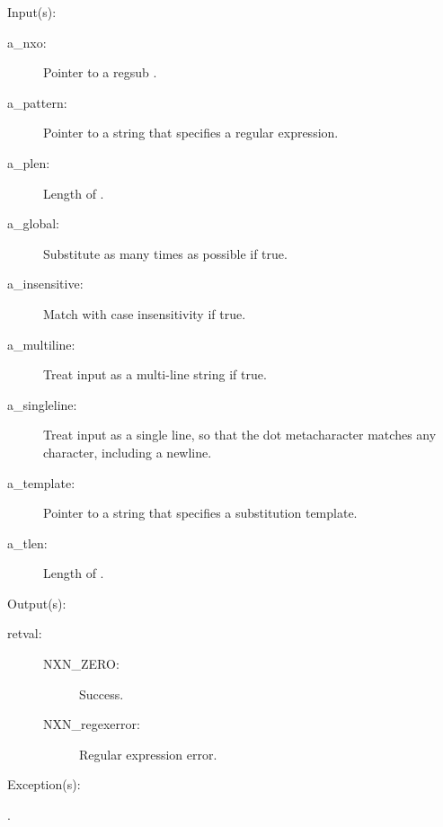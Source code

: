 \begin{capi}
\label{nxo_regsub_new}
	\begin{capilist}
	\item[Input(s): ]
		\begin{description}\item[]
		\item[a\_nxo: ]
			Pointer to a regsub .
		\item[a\_pattern: ]
			Pointer to a string that specifies a regular expression.
		\item[a\_plen: ]
			Length of .
		\item[a\_global: ]
			Substitute as many times as possible if true.
		\item[a\_insensitive: ]
			Match with case insensitivity if true.
		\item[a\_multiline: ]
			Treat input as a multi-line string if true.
		\item[a\_singleline: ]
			Treat input as a single line, so that the dot
			metacharacter matches any character, including a
			newline.
		\item[a\_template: ]
			Pointer to a string that specifies a substitution
			template.
		\item[a\_tlen: ]
			Length of .
		\end{description}
	\item[Output(s): ]
		\begin{description}\item[]
		\item[retval: ]
			\begin{description}\item[]
			\item[NXN\_ZERO: ] Success.
			\item[NXN\_regexerror: ] Regular expression error.
			\end{description}
		\end{description}
	\item[Exception(s): ]
		\begin{description}\item[]
		\item[.]
		\end{description}

\end{capilist}
\end{capi}

